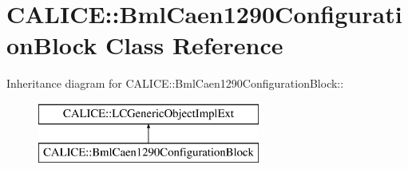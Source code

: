 \section{CALICE::BmlCaen1290ConfigurationBlock Class Reference}
\label{classCALICE_1_1BmlCaen1290ConfigurationBlock}
Inheritance diagram for CALICE::BmlCaen1290ConfigurationBlock::\begin{figure}[H]
\begin{center}
\leavevmode
\includegraphics[height=2cm]{classCALICE_1_1BmlCaen1290ConfigurationBlock}
\end{center}
\end{figure}
